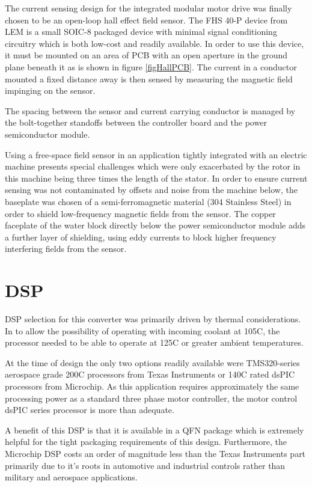 The current sensing design for the integrated modular motor drive was finally
chosen to be an open-loop hall effect field sensor.
The FHS 40-P device from LEM is a small SOIC-8 packaged device with minimal
signal conditioning circuitry which is both low-cost and readily available.
In order to use this device, it must be mounted on an area of PCB with an open
aperture in the ground plane beneath it as is shown in figure
\ref{figHallPCB}.
The current in a conductor mounted a fixed distance away is then sensed by
measuring the magnetic field impinging on the sensor.

The spacing between the sensor and current carrying conductor is managed by
the bolt-together standoffs between the controller board and the power
semiconductor module.

Using a free-space field sensor in an application tightly integrated with an
electric machine presents special challenges which were only exacerbated by
the rotor in this machine being three times the length of the stator.
In order to ensure current sensing was not contaminated by offsets and noise
from the machine below, the baseplate was chosen of a semi-ferromagnetic
material (304 Stainless Steel) in order to shield low-frequency magnetic
fields from the sensor.
The copper faceplate of the water block directly below the power semiconductor
module adds a further layer of shielding, using eddy currents to block higher
frequency interfering fields from the sensor.

\section{DSP}
DSP selection for this converter was primarily driven by thermal
considerations. In to allow the possibility of operating with incoming coolant
at 105C, the processor needed to be able to operate at 125C or greater ambient
temperatures.

At the time of design the only two options readily available were
TMS320-series aerospace grade 200C processors from Texas Instruments or 140C
rated dsPIC processors from Microchip. As this application requires
approximately the same processing power as a standard three phase motor
controller, the motor control dsPIC series processor is more than adequate.

A benefit of this DSP is that it is available in a QFN package which is
extremely helpful for the tight packaging requirements of this design.
Furthermore, the Microchip DSP costs an order of magnitude less than the Texas
Instruments part primarily due to it's roots in automotive and industrial
controls rather than military and aerospace applications.

